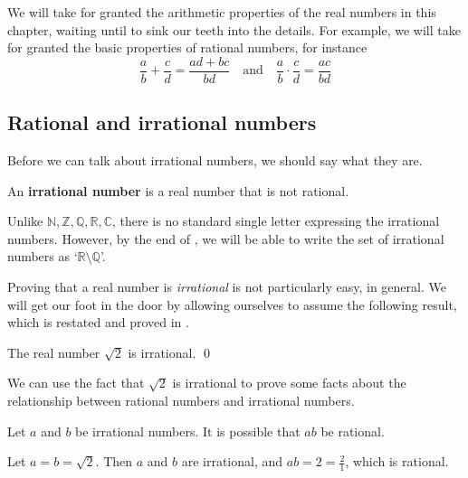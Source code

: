 We will take for granted the arithmetic properties of the real numbers in this chapter, waiting until  to sink our teeth into the details. For example, we will take for granted the basic properties of rational numbers, for instance
\[ \frac{a}{b}+\frac{c}{d} = \frac{ad+bc}{bd} \quad \text{and} \quad \frac{a}{b} \cdot \frac{c}{d} = \frac{ac}{bd} \]

\subsection*{Rational and irrational numbers}
\label{pGettingStartedRationalNumbers}

Before we can talk about irrational numbers, we should say what they are.

\begin{definition}
\label{defIrrationalNumber}
An \textbf{irrational number} is a real number that is not rational.
\end{definition}

Unlike $\mathbb{N},\mathbb{Z},\mathbb{Q},\mathbb{R},\mathbb{C}$, there is no standard single letter expressing the irrational numbers. However, by the end of , we will be able to write the set of irrational numbers as `$\mathbb{R} \setminus \mathbb{Q}$'.

Proving that a real number is \textit{irrational} is not particularly easy, in general. We will get our foot in the door by allowing ourselves to assume the following result, which is restated and proved in .

\begin{proposition}
\label{propSqrt2IrrationalPreliminary}
The real number $\sqrt{2}$ is irrational. \qed
\end{proposition}


We can use the fact that $\sqrt{2}$ is irrational to prove some facts about the relationship between rational numbers and irrational numbers.

\begin{proposition}
Let $a$ and $b$ be irrational numbers. It is possible that $ab$ be rational.
\end{proposition}

\begin{cproof}
Let $a=b=\sqrt{2}$. Then $a$ and $b$ are irrational, and $ab=2=\frac{2}{1}$, which is rational.
\end{cproof}

